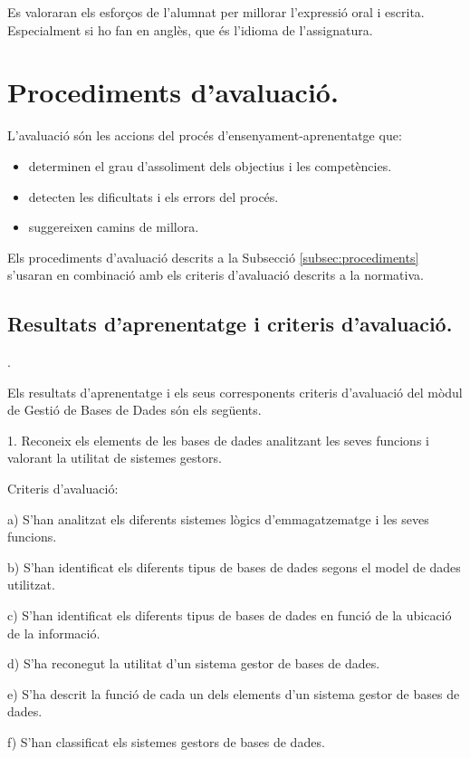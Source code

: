 \documentclass[catalan, a4paper, 12pt, titlepage]{article}
\begin{document}
Es valoraran els esforços de l'alumnat per millorar l'expressió oral i escrita. Especialment si ho fan en anglès, que és l'idioma de l'assignatura.

\section{Procediments d'avaluació.}
\label{sec:procediments}

L'avaluació \cite{coll2017} són les accions del procés d'ensenyament-aprenentatge que:

\begin{itemize}
	\item determinen el grau d'assoliment dels objectius i les competències.
	\item detecten les dificultats i els errors del procés.
	\item suggereixen camins de millora.
\end{itemize}

Els procediments d'avaluació descrits a la Subsecció \ref{subsec:procediments} s'usaran en combinació amb els criteris d'avaluació descrits a la normativa.

\subsection{Resultats d'aprenentatge i criteris d'avaluació.}
\label{subsec:resultats}.

Els resultats d'aprenentatge i els seus corresponents criteris d'avaluació del mòdul de Gestió de Bases de Dades són els següents.

1. Reconeix els elements de les bases de dades analitzant les seves funcions i valorant la utilitat de sistemes gestors.

Criteris d'avaluació:

a) S'han analitzat els diferents sistemes lògics d'emmagatzematge i les seves funcions.

b) S'han identificat els diferents tipus de bases de dades segons el model de dades utilitzat.

c) S'han identificat els diferents tipus de bases de dades en funció de la ubicació de la informació.

d) S'ha reconegut la utilitat d'un sistema gestor de bases de dades.

e) S'ha descrit la funció de cada un dels elements d'un sistema gestor de bases de dades.

f) S'han classificat els sistemes gestors de bases de dades.
\end{document}
